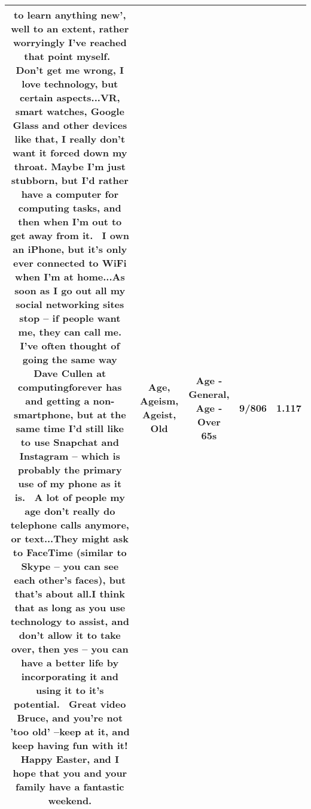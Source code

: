 \documentclass[11pt]{article}
\newlength\mylength
\begin{document}
\begin{center}
\begin{longtable}{|C{.65\mylength}|C{.30\mylength}|C{.12\mylength}|C{.12\mylength}|C{.12\mylength}|}
to learn anything new', well to an extent, rather worryingly I've reached that point myself.  Don't get me wrong, I love technology, but certain aspects...VR, smart watches, Google Glass and other devices like that, I really don't want it forced down my throat. Maybe I'm just stubborn, but I'd rather have a computer for computing tasks, and then when I'm out to get away from it.  I own an iPhone, but it's only ever connected to WiFi when I'm at home...As soon as I go out all my social networking sites stop – if people want me, they can call me. I've often thought of going the same way Dave Cullen at computingforever has and getting a non-smartphone, but at the same time I'd still like to use Snapchat and Instagram – which is probably the primary use of my phone as it is.  A lot of people my \textbf{age} don't really do telephone calls anymore, or text...They might ask to FaceTime (similar to Skype – you can see each other's faces), but that's about all.I think that as long as you use technology to assist, and don't allow it to take over, then yes – you can have a better life by incorporating it and using it to it's potential.  Great video Bruce, and you're not 'too \textbf{old}' –keep at it, and keep having fun with it!  Happy Easter, and I hope that you and your family have a fantastic weekend.\normalsize   & Age, Ageism, Ageist, Old & Age - General, Age - Over 65s & 9/806 & 1.117 \\  \hline

\end{longtable}
\end{center}
\end{document}
